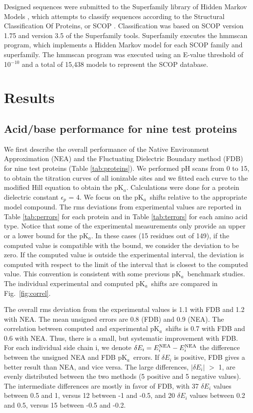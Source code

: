 \documentclass[a4paper,12pt]{article}
\newcommand{\pk}{pK$_a$}
\begin{document}
Designed sequences were submitted to the Superfamily library of Hidden Markov Models \cite{Gough01,Wilson07}, which
attempts to classify sequences according to the Structural Classification Of Proteins, or SCOP \cite{Andreeva04}.
Classification was based on SCOP version 1.75 and version 3.5 of the Superfamily tools. Superfamily executes the hmmscan
program, which implements a Hidden Markov model for each SCOP family and superfamily. The hmmscan program was executed
using an E-value threshold of 10$^{-10}$ and a total of 15,438 models to represent the SCOP database.

\section{Results}
\subsection{Acid/base performance for nine test proteins}
We first describe the overall performance of the Native Environment Approximation (NEA) and the
Fluctuating Dielectric Boundary method (FDB) for nine test proteins (Table \ref{tab:proteins}). We
performed pH scans from 0 to 15, to obtain the titration curves of all ionizable sites and we fitted
each curve to the modified Hill equation to obtain the \pk. Calculations were done for a protein
dielectric constant $\epsilon_p$ = 4. We focus on the \pk\ shifts relative to the appropriate model
compound. The rms deviations from experimental values are reported in Table \ref{tab:perrors} for
each protein and in Table \ref{tab:terrors} for each amino acid type. Notice that some of the
experimental measurements only provide an upper or a lower bound for the \pk. In these cases (15
residues out of 149), if the computed value is compatible with the bound, we consider the deviation
to be zero. If the computed value is outside the experimental interval, the deviation is computed
with respect to the limit of the interval that is closest to the computed value. This convention
is consistent with some previous \pk\ benchmark studies. The individual experimental and computed
\pk\ shifts are compared in Fig.\ \ref{fig:correl}. 

The overall rms deviation from the experimental values is 1.1 with FDB and 1.2 with NEA. The mean
unsigned errors are 0.8 (FDB) and 0.9 (NEA). The correlation between computed and experimental \pk\
shifts is 0.7 with FDB and 0.6 with NEA. Thus, there is a small, but systematic improvement with FDB.
For each individual side chain i, we denote $\delta E_i = E_i^{\rm NEA} - E_i^{\rm NEA}$ the difference
between the unsigned NEA and FDB \pk\ errors. If $\delta E_i$ is positive, FDB gives a better result
than NEA, and vice versa. The large differences, $|\delta E_i|$ $>$ 1, are evenly distributed between
the two methods (5 positive and 5 negative values). The intermediate differences are mostly in favor
of FDB, with 37 $\delta E_i$ values between 0.5 and 1, versus 12 between -1 and -0.5, and 20 $\delta E_i$
values between 0.2 and 0.5, versus 15 between -0.5 and -0.2.
\end{document}
